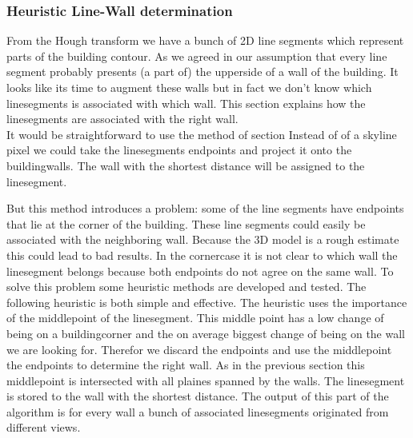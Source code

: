 \subsubsection{Heuristic Line-Wall determination}
	From the Hough transform we have a bunch of 2D line segments which represent parts of the building contour. 
	As we agreed in our assumption that every line segment probably presents (a part of) the upperside of a wall of the building.
	It looks like its time to augment these walls but in fact we don't know which linesegments is associated with which wall.
	This section explains how the linesegments are associated with the right wall.\\

	It would be straightforward to use the method of section %
	Instead of of a skyline pixel we could take the linesegments endpoints and project it onto the buildingwalls. The wall with the shortest distance will be assigned to the linesegment.

	But this method introduces a problem: some of the line segments have endpoints that lie at the corner of the building. These line segments could easily be associated with the neighboring wall. Because the 3D model is a rough estimate this could lead to bad results.
	In the cornercase it is not clear to which wall the linesegment belongs because both endpoints do not agree on the same wall. To solve this problem some heuristic methods are developed and tested. The following heuristic is both simple and effective.
	The heuristic uses the importance of the middlepoint of the linesegment. This middle point has a low change of being on a buildingcorner and the on average biggest change of being on the wall we are looking for.
	Therefor we discard the endpoints and use the middlepoint the endpoints to determine the right wall.
	As in the previous section %
	this middlepoint is intersected with all plaines spanned by the walls. The linesegment is stored to the wall with the shortest distance.
	The output of this part of the algorithm is for every wall a bunch of associated linesegments originated from different views.


